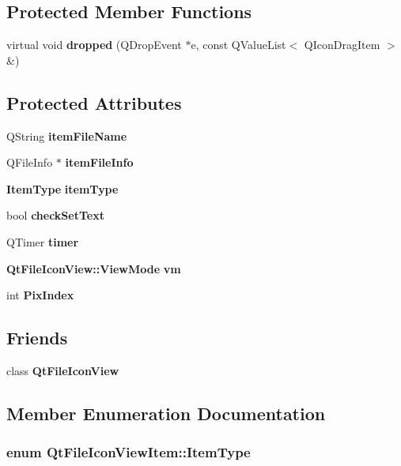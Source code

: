 \subsection*{Protected Member Functions}
\begin{CompactItemize}
\item 
virtual void {\bf dropped} (QDrop\-Event $\ast$e, const QValue\-List$<$ QIcon\-Drag\-Item $>$ \&)
\end{CompactItemize}
\subsection*{Protected Attributes}
\begin{CompactItemize}
\item 
QString {\bf item\-File\-Name}
\item 
QFile\-Info $\ast$ {\bf item\-File\-Info}
\item 
{\bf Item\-Type} {\bf item\-Type}
\item 
bool {\bf check\-Set\-Text}
\item 
QTimer {\bf timer}
\item 
{\bf Qt\-File\-Icon\-View::View\-Mode} {\bf vm}
\item 
int {\bf Pix\-Index}
\end{CompactItemize}
\subsection*{Friends}
\begin{CompactItemize}
\item 
class {\bf Qt\-File\-Icon\-View}
\end{CompactItemize}


\subsection{Member Enumeration Documentation}
\subsubsection{\setlength{\rightskip}{0pt plus 5cm}enum {\bf Qt\-File\-Icon\-View\-Item::Item\-Type}}\label{classQtFileIconViewItem_QtFileIconViewItemw4}



